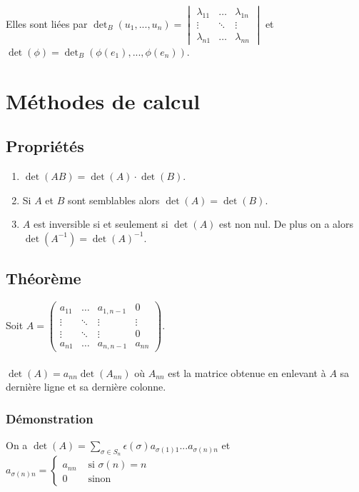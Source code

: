 \documentclass[a4paper,10pt]{book} %
\newcommand{\displayAmath}{\displaystyle}
\begin{document}
Elles sont liées par $\det_B(u_1,...,u_n)=\begin{vmatrix}
\lambda_{11}&\dots&\lambda_{1n}\\
\vdots&\ddots&\vdots\\
\lambda_{n1}&\dots&\lambda_{nn}
\end{vmatrix}$ et $\det(\phi)=\det_B(\phi(e_1),...,\phi(e_n))$.

\section{Méthodes de calcul}
\subsection{Propriétés}
\begin{enumerate}
\item $\det(AB)=\det(A)\cdot \det(B)$.
\item Si $A$ et $B$ sont semblables alors $\det(A)=\det(B)$.
\item $A$ est inversible si et seulement si $\det(A)$ est non nul. De plus on a alors $\det(A^{-1})=\det(A)^{-1}$.
\end{enumerate}

\subsection{Théorème}
Soit $A=\begin{pmatrix}
a_{11}&\dots&a_{1,n-1}&0\\
\vdots&\ddots&\vdots&\vdots\\
\vdots&\ddots&\vdots&0\\
a_{n1}&\dots&a_{n,n-1}&a_{nn}
\end{pmatrix}$.\\\\

$\det(A)=a_{nn}\det(A_{nn})$ où $A_{nn}$ est la matrice obtenue en enlevant à $A$ sa dernière ligne et sa dernière colonne.

\subsubsection{Démonstration}
On a $\displayAmath\det(A)=\sum_{\sigma\in S_n}\epsilon(\sigma)a_{\sigma(1)1}...a_{\sigma(n)n}$ et $a_{\sigma(n)n}=\left\{\begin{array}{rl}
a_{nn}&\text{ si }\sigma(n)=n\\
0&\text{ sinon}
\end{array}\right.$\\
\end{document}
